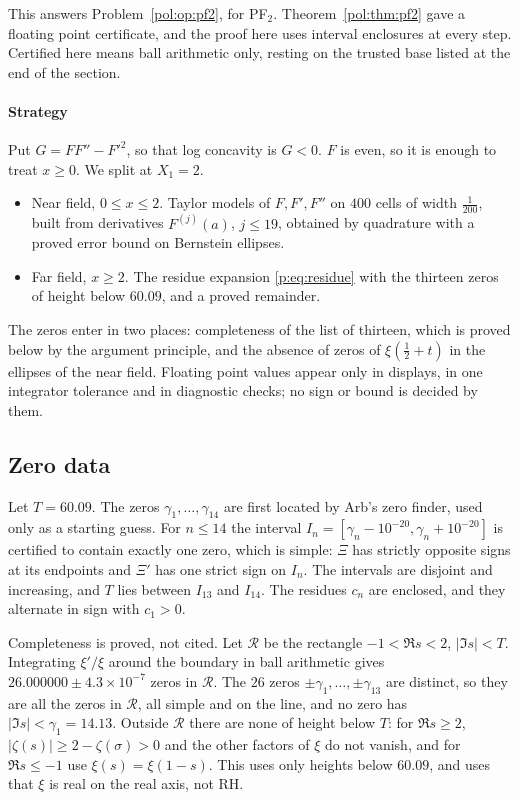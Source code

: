 This answers Problem~\ref{pol:op:pf2}, for PF$_2$. Theorem~\ref{pol:thm:pf2} gave a floating point certificate, and the proof here uses interval enclosures at every step. Certified here means ball arithmetic only, resting on the trusted base listed at the end of the section.

\paragraph{Strategy} Put $G=FF''-F'^2$, so that log concavity is $G<0$. $F$ is even, so it is enough to treat $x\ge0$. We split at $X_1=2$.
\begin{itemize}
\item Near field, $0\le x\le2$. Taylor models of $F,F',F''$ on $400$ cells of width $\frac1{200}$, built from derivatives $F^{(j)}(a)$, $j\le19$, obtained by quadrature with a proved error bound on Bernstein ellipses.
\item Far field, $x\ge2$. The residue expansion \eqref{p:eq:residue} with the thirteen zeros of height below $60.09$, and a proved remainder.
\end{itemize}
The zeros enter in two places: completeness of the list of thirteen, which is proved below by the argument principle, and the absence of zeros of $\xi(\frac12+t)$ in the ellipses of the near field. Floating point values appear only in displays, in one integrator tolerance and in diagnostic checks; no sign or bound is decided by them.

\subsection{Zero data}

Let $T=60.09$. The zeros $\gamma_1,\dots,\gamma_{14}$ are first located by Arb's zero finder, used only as a starting guess. For $n\le14$ the interval $I_n=[\gamma_n-10^{-20},\gamma_n+10^{-20}]$ is certified to contain exactly one zero, which is simple: $\Xi$ has strictly opposite signs at its endpoints and $\Xi'$ has one strict sign on $I_n$. The intervals are disjoint and increasing, and $T$ lies between $I_{13}$ and $I_{14}$. The residues $c_n$ are enclosed, and they alternate in sign with $c_1>0$.

Completeness is proved, not cited. Let $\mathcal R$ be the rectangle $-1<\Re s<2$, $|\Im s|<T$. Integrating $\xi'/\xi$ around the boundary in ball arithmetic gives $26.000000\pm4.3\times10^{-7}$ zeros in $\mathcal R$. The $26$ zeros $\pm\gamma_1,\dots,\pm\gamma_{13}$ are distinct, so they are all the zeros in $\mathcal R$, all simple and on the line, and no zero has $|\Im s|<\gamma_1=14.13$. Outside $\mathcal R$ there are none of height below $T$: for $\Re s\ge2$, $|\zeta(s)|\ge2-\zeta(\sigma)>0$ and the other factors of $\xi$ do not vanish, and for $\Re s\le-1$ use $\xi(s)=\xi(1-s)$. This uses only heights below $60.09$, and uses that $\xi$ is real on the real axis, not RH.

